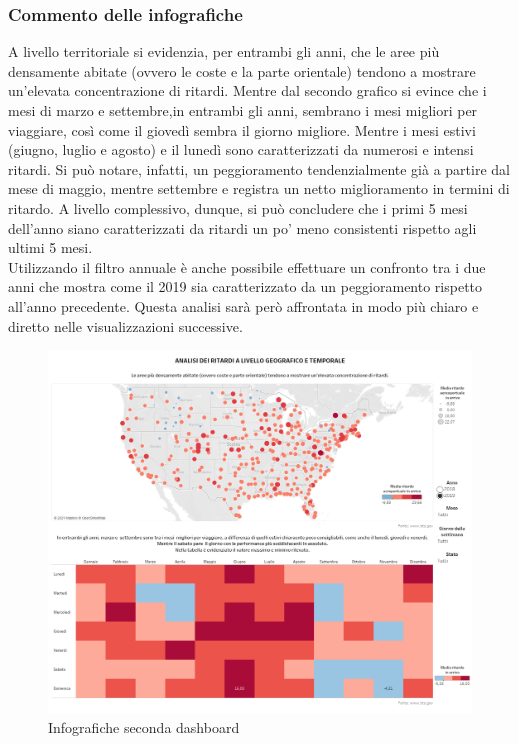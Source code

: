 \documentclass[12pt]{article}
\begin{document}
\subsubsection{Commento delle infografiche}
A livello territoriale si evidenzia, per entrambi gli anni, che le aree più densamente abitate (ovvero le coste e la parte orientale) tendono a mostrare un'elevata concentrazione di ritardi.
Mentre dal secondo grafico si evince che i mesi di marzo e settembre,in entrambi gli anni, sembrano i mesi migliori per viaggiare, così come il giovedì sembra il giorno migliore. Mentre i mesi estivi (giugno, luglio e agosto) e il lunedì sono caratterizzati da numerosi e intensi ritardi. Si può notare, infatti, un peggioramento tendenzialmente già a partire dal mese di maggio, mentre settembre e registra un netto miglioramento in termini di ritardo. A livello complessivo, dunque, si può concludere che i primi 5 mesi dell'anno siano caratterizzati da ritardi un po' meno consistenti rispetto agli ultimi 5 mesi.\\
Utilizzando il filtro annuale è anche possibile effettuare un confronto tra i due anni che mostra come il 2019 sia caratterizzato da un peggioramento rispetto all'anno precedente. Questa analisi sarà però affrontata in modo più chiaro e diretto nelle visualizzazioni successive.

\begin{figure}[H]
    \hspace{-33pt}
    \includegraphics[scale = 0.53]{img/dashboard/Dashboard2.png}
    \caption{Infografiche seconda dashboard}
    \label{dash2}
\end{figure}
\end{document}
